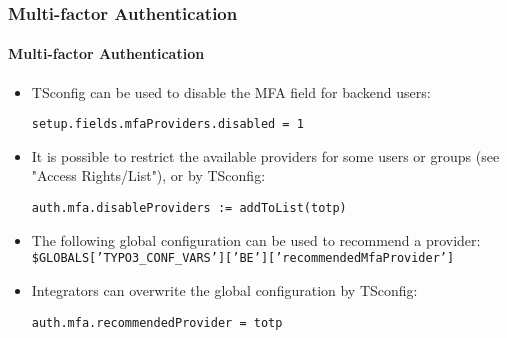 %

\begin{frame}[fragile]
	\frametitle{Multi-factor Authentication}
	\framesubtitle{Multi-factor Authentication}


	\begin{itemize}
		\item TSconfig can be used to disable the MFA field for backend users:
\begin{lstlisting}
setup.fields.mfaProviders.disabled = 1
\end{lstlisting}

		\item It is possible to restrict the available providers for some users
			or groups (see "Access Rights/List"), or by TSconfig:
\begin{lstlisting}
auth.mfa.disableProviders := addToList(totp)
\end{lstlisting}

		\item The following global configuration can be used to recommend a provider:\newline
			\smaller\texttt{\$GLOBALS['TYPO3\_CONF\_VARS']['BE']['recommendedMfaProvider']}\normalsize

		\item Integrators can overwrite the global configuration by TSconfig:
\begin{lstlisting}
auth.mfa.recommendedProvider = totp
\end{lstlisting}

	\end{itemize}

\end{frame}

